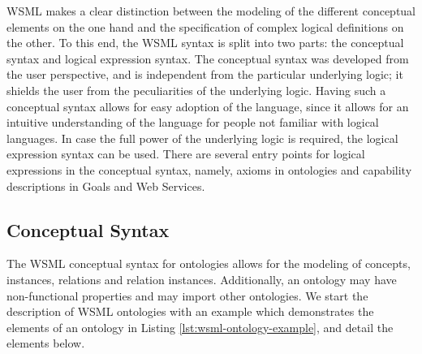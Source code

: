WSML makes a clear distinction between the modeling of the different
conceptual elements on the one hand and the specification of complex
logical definitions on the other. To this end, the WSML syntax is
split into two parts: the conceptual syntax and logical expression
syntax. The conceptual syntax was developed from the user
perspective, and is independent from the particular underlying
logic; it shields the user from the peculiarities of the underlying
logic. Having such a conceptual syntax allows for easy adoption of
the language, since it allows for an intuitive understanding of the
language for people not familiar with logical languages. In case the
full power of the underlying logic is required, the logical
expression syntax can be used. There are several entry points for
logical expressions in the conceptual syntax, namely, axioms in
ontologies and capability descriptions in Goals and Web Services.

\subsection{Conceptual Syntax}
\label{sec:conceptual-syntax}

The WSML conceptual syntax for ontologies allows for the modeling of
concepts, instances, relations and relation instances. Additionally,
an ontology may have non-functional properties and may import other
ontologies. We start the description of WSML ontologies with an
example which demonstrates the elements of an ontology in Listing
\ref{lst:wsml-ontology-example}, and detail the elements below.

